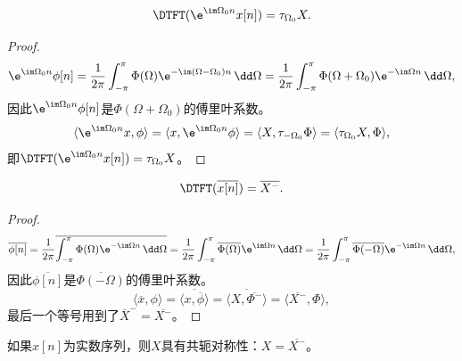 \begin{proposition}[频移性质]
    \begin{equation}
        \DTFT(\e^{\im\Omega_0 n}x[n])=\tau_{\Omega_0}X.
    \end{equation}
\end{proposition}
\begin{proof}
    \begin{equation}
        \e^{\im\Omega_0 n}\phi[n]=\frac{1}{2\pi}\int_{-\pi}^{\pi}\Phi(\Omega)\e^{-\im(\Omega-\Omega_0) n}\,\dd\Omega=\frac{1}{2\pi}\int_{-\pi}^{\pi}\Phi(\Omega+\Omega_0)\e^{-\im\Omega n}\,\dd\Omega,
    \end{equation}
    因此$\e^{\im\Omega_0 n}\phi[n]$是$\Phi(\Omega+\Omega_0)$的傅里叶系数。
    \begin{equation}
        \langle \e^{\im\Omega_0 n}x,\phi\rangle=\langle x,\e^{\im\Omega_0 n}\phi\rangle=\langle X,\tau_{-\Omega_0}\Phi\rangle=\langle \tau_{\Omega_0}X,\Phi\rangle,
    \end{equation}
    即$\DTFT(\e^{\im\Omega_0 n}x[n])=\tau_{\Omega_0}X$。
\end{proof}

\begin{proposition}[共轭性质]
    \begin{equation}
        \DTFT(\overline{x[n]})=\overline{X^-}.
    \end{equation}
\end{proposition}
\begin{proof}
    \begin{equation}
        \overline{\phi[n]}=\frac{1}{2\pi}\overline{\int_{-\pi}^{\pi}\Phi(\Omega)\e^{-\im\Omega n}\,\dd\Omega}=\frac{1}{2\pi}\int_{-\pi}^{\pi}\overline{\Phi(\Omega)}\e^{\im\Omega n}\,\dd\Omega=\frac{1}{2\pi}\int_{-\pi}^{\pi}\overline{\Phi(-\Omega)}\e^{-\im\Omega n}\,\dd\Omega,
    \end{equation}
    因此$\overline{\phi[n]}$是$\overline{\Phi(-\Omega)}$的傅里叶系数。
    \begin{equation}
        \langle \overline{x},\phi\rangle=\overline{\langle x,\overline{\phi}\rangle}=\overline{\langle X,\overline{\Phi^-}\rangle}=\langle \overline{X^-},\Phi\rangle,
    \end{equation}
    最后一个等号用到了$\overline{X}^-=\overline{X^-}$。
\end{proof}
\begin{corollary}
    如果$x[n]$为实数序列，则$X$具有共轭对称性：$X=\overline{X^-}$。
\end{corollary}

